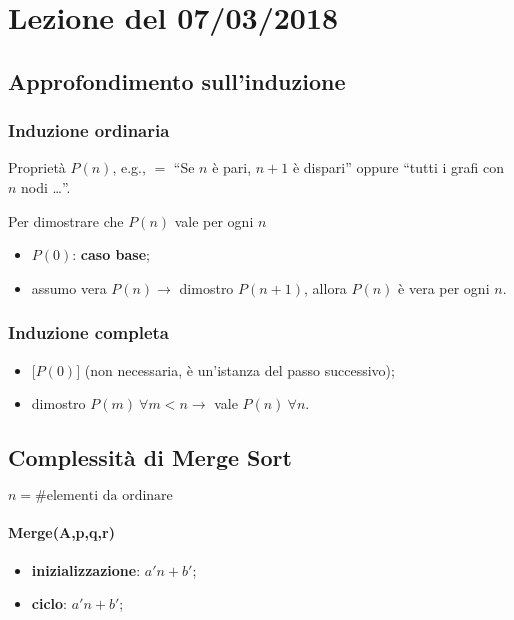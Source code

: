 \section{Lezione del 07/03/2018}

\subsection{Approfondimento sull'induzione}

\subsubsection{Induzione ordinaria} 

Proprietà $P(n)$, e.g., $ = $ ``Se $n$ è pari, $n+1$ è dispari'' oppure 
``tutti i grafi con $n$ nodi \dots ''.\par
Per dimostrare che $P(n)$ vale per ogni $n$
\begin{itemize}
	\item $P(0)$: \textbf{caso base};
	\item assumo vera $P(n) \rightarrow $ dimostro $P(n+1)$, allora $P(n)$
	è vera per ogni $n$.
\end{itemize}

\subsubsection{Induzione completa}
\begin{itemize}
	\item $\big[ P(0) \big]$ (non necessaria, è un'istanza del passo successivo);
	\item dimostro $P(m) \ \forall m<n \rightarrow $ vale $P(n) \ \forall n$.  
\end{itemize}

\subsection{Complessità di Merge Sort}

$n = \#\text{elementi da ordinare}$

\paragraph{Merge(A,p,q,r)}
\begin{itemize}
	\item[] \textbf{inizializzazione}: $a'n+b'$;
	\item[] \textbf{ciclo}: $a'n+b'$;
\end{itemize}

